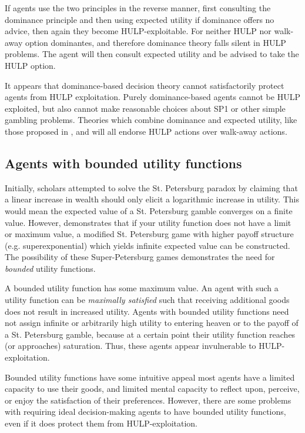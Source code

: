 \documentclass{article}
\begin{document}
If agents use the two principles in the reverse manner, first consulting the dominance principle and then using expected utility if dominance offers no advice, then again they become HULP-exploitable. For neither HULP nor walk-away option dominantes, and therefore dominance theory falls silent in HULP problems. The agent will then consult expected utility and be advised to take the HULP option.

It appears that dominance-based decision theory cannot satisfactorily protect agents from HULP exploitation. Purely dominance-based agents cannot be HULP exploited, but also cannot make reasonable choices about SP1 or other simple gambling problems. Theories which combine dominance and expected utility, like those proposed in \citep{colyvan2008relative}, \citep{colyvan2006no} and \citep{easwaran2009dominance} will all endorse HULP actions over walk-away actions. 

\subsection{Agents with bounded utility functions}

Initially, scholars attempted to solve the St. Petersburg paradox by claiming that a linear increase in wealth should only elicit a logarithmic increase in utility. This would mean the expected value of a St. Petersburg gamble converges on a finite value. However, \citep{menger1934petersburg} demonstrates that if your utility function does not have a limit or maximum value, a modified St. Petersburg game with higher payoff structure (e.g. superexponential) which yields infinite expected value can be constructed. The possibility of these Super-Petersburg games demonstrates the need for \textit{bounded} utility functions.

A bounded utility function has some maximum value. An agent with such a utility function can be \textit{maximally satisfied} such that receiving additional goods does not result in increased utility. Agents with bounded utility functions need not assign infinite or arbitrarily high utility to entering heaven or to the payoff of a St. Petersburg gamble, because at a certain point their utility function reaches (or approaches) saturation. Thus, these agents appear invulnerable to HULP-exploitation. 

Bounded utility functions have some intuitive appeal \textemdash{} most agents have a limited capacity to use their goods, and limited mental capacity to reflect upon, perceive, or enjoy the satisfaction of their preferences. However, there are some problems with requiring ideal decision-making agents to have bounded utility functions, even if it does protect them from HULP-exploitation.
\end{document}
